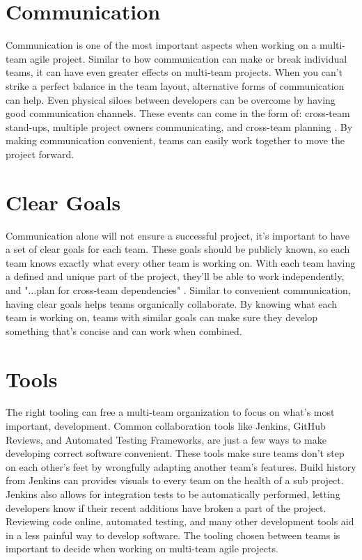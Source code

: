 \documentclass[sigplan,screen]{acmart}
\begin{document}
\section{Communication}
Communication is one of the most important aspects when working on a multi-team agile project.
Similar to how communication can make or break individual teams, it can have even greater effects on multi-team projects.
When you can't strike a perfect balance in the team layout, alternative forms of communication can help.
Even physical siloes between developers can be overcome by having good communication channels.
These events can come in the form of: cross-team stand-ups, multiple project owners communicating, and cross-team planning \cite{b2}.
By making communication convenient, teams can easily work together to move the project forward.

\section{Clear Goals}
Communication alone will not ensure a successful project, it's important to have a set of clear goals for each team.
These goals should be publicly known, so each team knows exactly what every other team is working on.
With each team having a defined and unique part of the project, they'll be able to work independently, and "...plan for cross-team dependencies" \cite{b2}. 
Similar to convenient communication, having clear goals helps teams organically collaborate.
By knowing what each team is working on, teams with similar goals can make sure they develop something that's concise and can work when combined.


\section{Tools}
The right tooling can free a multi-team organization to focus on what's most important, development.
Common collaboration tools like Jenkins, GitHub Reviews, and Automated Testing Frameworks, are just a few ways to make developing correct software convenient.
These tools make sure teams don't step on each other's feet by wrongfully adapting another team's features.
Build history from Jenkins can provides visuals to every team on the health of a sub project.
Jenkins also allows for integration tests to be automatically performed, letting developers know if their recent additions have broken a part of the project.
Reviewing code online, automated testing, and many other development tools aid in a less painful way to develop software.
The tooling chosen between teams is important to decide when working on multi-team agile projects.
\end{document}
